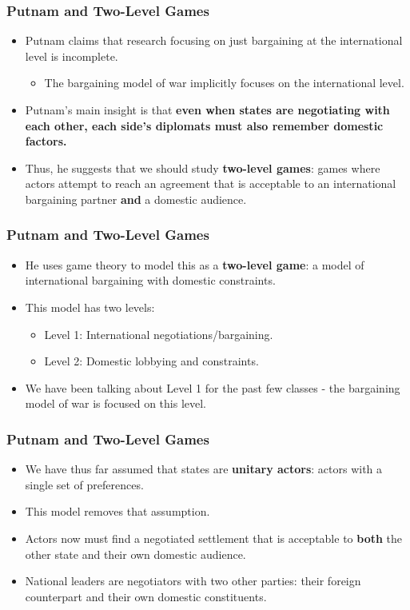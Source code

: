 \documentclass{beamer}
\begin{document}
\begin{frame} 
\frametitle{\LARGE{Putnam and Two-Level Games}}
	\begin{itemize}
		\item Putnam claims that research focusing on just bargaining at the international level is incomplete. \pause
		\begin{itemize}
			\item The bargaining model of war implicitly focuses on the international level. \pause
		\end{itemize}
		\item Putnam's main insight is that \textbf{even when states are negotiating with each other, each side's diplomats must also remember domestic factors.} \pause
		\item Thus, he suggests that we should study \textbf{two-level games}: games where actors attempt to reach an agreement that is acceptable to an international bargaining partner \textbf{and} a domestic audience.
	\end{itemize}
\end{frame}

\begin{frame} 
	\frametitle{\LARGE{Putnam and Two-Level Games}}
	\begin{itemize}
		\item He uses game theory to model this as a \textbf{two-level game}: a model of international bargaining with domestic constraints. \pause
		\item This model has two levels:
		\begin{itemize}
			\item Level 1: International negotiations/bargaining. \pause
			\item Level 2: Domestic lobbying and constraints. \pause
		\end{itemize}
		\item We have been talking about Level 1 for the past few classes - the bargaining model of war is focused on this level. 
	\end{itemize}
\end{frame}

\begin{frame} 
	\frametitle{\LARGE{Putnam and Two-Level Games}}
	\begin{itemize}
		\item We have thus far assumed that states are \textbf{unitary actors}: actors with a single set of preferences.
		\item This model removes that assumption. \pause
		\item Actors now must find a negotiated settlement that is acceptable to \textbf{both}  the other state and their own domestic audience. \pause
		\item National leaders are negotiators with two other parties: their foreign counterpart and their own domestic constituents. 
	\end{itemize}
\end{frame}
\end{document}
